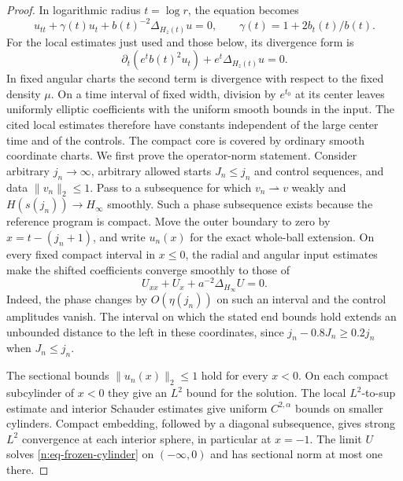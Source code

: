 \begin{proof}
In logarithmic radius \(t=\log r\), the equation becomes
\begin{equation}
 u_{tt}+\gamma(t)u_t+b(t)^{-2}\Delta_{H_z(t)}u=0,
 \qquad \gamma(t)=1+2b_t(t)/b(t).
 \label{n:eq-logarithmic-harmonic}
\end{equation}
For the local estimates just used and those below, its divergence form is
\[
 \partial_t(e^t b(t)^2u_t)+e^t\Delta_{H_z(t)}u=0.
\]
In fixed angular charts the second term is divergence with respect to the
fixed density \(\mu\).  On a time interval of fixed width, division by
\(e^{t_0}\) at its center leaves uniformly elliptic coefficients with the
uniform smooth bounds in the input.  The cited local estimates therefore
have constants independent of the large center time and of the controls.
The compact core is covered by ordinary smooth coordinate charts.
We first prove the operator-norm statement.  Consider arbitrary
\(j_n\to\infty\), arbitrary allowed starts \(J_n\leq j_n\) and control sequences, and data
\(\|v_n\|_2\leq1\).  Pass to a subsequence for which \(v_n\rightharpoonup v\)
weakly and \(H(s(j_n))\to H_\infty\) smoothly.  Such a phase subsequence
exists because the reference program is compact.  Move the outer boundary
to zero by \(x=t-(j_n+1)\), and write \(u_n(x)\) for the exact whole-ball
extension.  On every fixed compact interval in \(x\leq0\), the radial and
angular input estimates make the shifted coefficients converge smoothly to
those of
\begin{equation}
 U_{xx}+U_x+a^{-2}\Delta_{H_\infty}U=0.
 \label{n:eq-frozen-cylinder}
\end{equation}
Indeed, the phase changes by \(O(\eta(j_n))\) on such an interval and the
control amplitudes vanish.  The interval on which the stated end bounds
hold extends an unbounded distance to the left in these coordinates,
since \(j_n-0.8J_n\geq0.2j_n\) when \(J_n\leq j_n\).

The sectional bounds \(\|u_n(x)\|_2\leq1\) hold for every \(x<0\).
On each compact subcylinder of \(x<0\) they give an \(L^2\) bound for the
solution.  The local \(L^2\)-to-sup estimate and interior Schauder estimates
\cite[Theorem~8.17 and Corollary~6.3]{GilbargTrudinger} give uniform
\(C^{2,\alpha}\) bounds on smaller cylinders.  Compact embedding, followed by a
diagonal subsequence, gives strong \(L^2\) convergence at each interior
sphere, in particular at \(x=-1\).  The limit \(U\) solves
\eqref{n:eq-frozen-cylinder} on \((-\infty,0)\) and has sectional norm at
most one there.


\end{proof}
